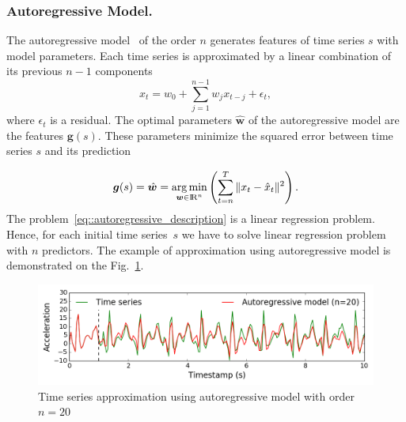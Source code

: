 \documentclass{llncs}
\DeclareMathOperator*{\argmin}{arg\,min}
\begin{document}
\subsubsection{Autoregressive Model.}
The autoregressive model~\cite{lukashin2003adaptive} of the order $n$ generates features of time series $s$ with model parameters. 
Each time series is approximated by a linear combination of its previous $n-1$ components 
\begin{equation*}
x_t = w_0 + \sum_{j=1}^{n-1} w_j x_{t-j} + \epsilon_t,
\end{equation*}
where $\epsilon_t$ is a residual. 
The optimal parameters $\hat{\bm{w}}$ of the autoregressive model are the features $\bm{g}(s)$.
These parameters minimize the squared error between time series $s$ and its prediction

\begin{equation}
\bm{g}(s) = \hat{\bm{w}} = \argmin_{\bm{w} \in \bbbr^{n}} \left( \sum_{t=n}^{T} \|x_t - \hat{x}_t\|^2\right).
\label{eq::autoregressive_description}
\end{equation}
The problem~\eqref{eq::autoregressive_description} is a linear regression problem. Hence, for each initial time series~$s$ we have to solve linear regression problem with $n$ predictors.
The example of approximation using autoregressive model is demonstrated on the Fig.~\ref{fig::ar_example}.

\begin{figure}[h]
	\centering
 	\includegraphics[width=1\linewidth]{figs/ar_example.png}
	\caption{Time series approximation using autoregressive model with order $n = 20$}
	\label{fig::ar_example}
\end{figure}
\end{document}
